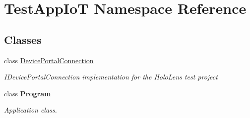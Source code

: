 \hypertarget{namespace_test_app_io_t}{}\section{Test\+App\+IoT Namespace Reference}
\label{namespace_test_app_io_t}
\subsection*{Classes}
\begin{DoxyCompactItemize}
\item 
class \hyperlink{class_test_app_io_t_1_1_device_portal_connection}{Device\+Portal\+Connection}
\begin{DoxyCompactList}\small\item\em I\+Device\+Portal\+Connection implementation for the Holo\+Lens test project \end{DoxyCompactList}\item 
class {\bfseries Program}
\begin{DoxyCompactList}\small\item\em Application class. \end{DoxyCompactList}\end{DoxyCompactItemize}
